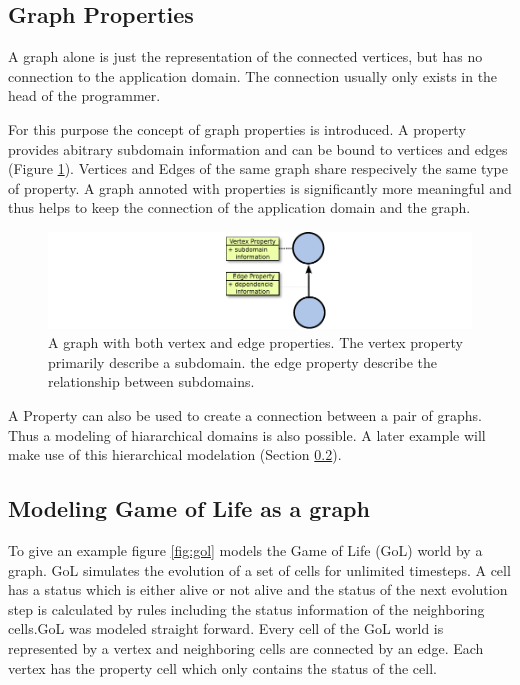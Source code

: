 
\subsection{Graph Properties}
A graph alone is just the representation of the connected vertices,
but has no connection to the application domain. The connection
usually only exists in the head of the programmer.

For this purpose the concept of graph properties is introduced. A
property provides abitrary subdomain information and can be bound to
vertices and edges (Figure \ref{fig:property}). Vertices and Edges of
the same graph share respecively the same type of property. A graph
annoted with properties is significantly more meaningful and thus
helps to keep the connection of the application domain and the graph.

\begin{figure}[H]
  \centering \includegraphics[width=\textwidth]{graphics/30_property}
  \caption{A graph with both vertex and edge properties. The vertex
    property primarily describe a subdomain. the edge property
    describe the relationship between subdomains.}
  \label{fig:property}
\end{figure}

A Property can also be used to create a connection between a pair of
graphs. Thus a modeling of hiararchical domains is also possible.  A
later example will make use of this hierarchical modelation (Section
\ref{sec:gol}).


\subsection{Modeling Game of Life as a graph}
\label{sec:gol}
To give an example figure \ref{fig:gol} models the Game of Life (GoL)
\cite{ref:gol} world by a graph. GoL simulates the evolution of a set
of cells for unlimited timesteps. A cell has a status which is either
alive or not alive and the status of the next evolution step is
calculated by rules including the status information of the
neighboring cells.GoL was modeled straight forward.  Every cell of the
GoL world is represented by a vertex and neighboring cells are
connected by an edge. Each vertex has the property cell which only
contains the status of the cell.

